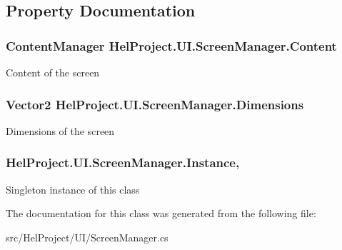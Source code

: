 \subsection{Property Documentation}
\hypertarget{class_hel_project_1_1_u_i_1_1_screen_manager_a0e0ac0e0475a6a7fa4e21c2c413a7bcc}{}
\subsubsection[{Content}]{\setlength{\rightskip}{0pt plus 5cm}Content\+Manager Hel\+Project.\+U\+I.\+Screen\+Manager.\+Content\hspace{0.3cm}{\ttfamily [get]}}\label{class_hel_project_1_1_u_i_1_1_screen_manager_a0e0ac0e0475a6a7fa4e21c2c413a7bcc}


Content of the screen 

\hypertarget{class_hel_project_1_1_u_i_1_1_screen_manager_abb86f242ecaa5f540e91701af01696de}{}
\subsubsection[{Dimensions}]{\setlength{\rightskip}{0pt plus 5cm}Vector2 Hel\+Project.\+U\+I.\+Screen\+Manager.\+Dimensions\hspace{0.3cm}{\ttfamily [get]}}\label{class_hel_project_1_1_u_i_1_1_screen_manager_abb86f242ecaa5f540e91701af01696de}


Dimensions of the screen 

\hypertarget{class_hel_project_1_1_u_i_1_1_screen_manager_acf1138ad8b8146a517d7b5288e3792de}{}
\subsubsection[{Instance}]{ Hel\+Project.\+U\+I.\+Screen\+Manager.\+Instance\hspace{0.3cm}{\ttfamily [static]}, {\ttfamily [get]}}\label{class_hel_project_1_1_u_i_1_1_screen_manager_acf1138ad8b8146a517d7b5288e3792de}


Singleton instance of this class 



The documentation for this class was generated from the following file\+:\begin{DoxyCompactItemize}
\item 
src/\+Hel\+Project/\+U\+I/Screen\+Manager.\+cs\end{DoxyCompactItemize}
